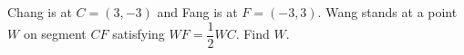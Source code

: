 Chang is at $C=(3,-3)$ and Fang is at $F=(-3,3)$. Wang stands at a point $W$ on segment $CF$ satisfying $WF=\dfrac{1}{2}WC$. Find $W$.
